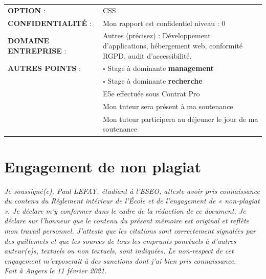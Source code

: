 \documentclass[12pt]{article}
\begin{document}
\begin{center}
	\begin{tabular}{ m{5cm} m{11.5cm} }
	\textbf{OPTION} : &  \mbox{\ooalign{$\checkmark$\cr\hidewidth$\square$\hidewidth\cr}} CSS  \\
    \textbf{CONFIDENTIALITÉ} :  & Mon rapport est confidentiel niveau : \mbox{\ooalign{$\checkmark$\cr\hidewidth$\square$\hidewidth\cr}} 0 \\
    \textbf{DOMAINE ENTREPRISE} : & \mbox{\ooalign{$\checkmark$\cr\hidewidth$\square$\hidewidth\cr}} Autres (précisez) : Développement d'applications, hébergement web, conformité RGPD, audit d'accessibilité. \\
    \textbf{AUTRES POINTS} : &  $\square$ Stage à dominante \textbf{management} \\
                             &  $\square$ Stage à dominante \textbf{recherche} \\
                             & \mbox{\ooalign{$\checkmark$\cr\hidewidth$\square$\hidewidth\cr}} E5e effectuée sous Contrat Pro \\
                             &  \mbox{\ooalign{$\checkmark$\cr\hidewidth$\square$\hidewidth\cr}} Mon tuteur sera présent à ma soutenance \\
                             &  \mbox{\ooalign{$\checkmark$\cr\hidewidth$\square$\hidewidth\cr}} Mon tuteur participera au déjeuner le jour de ma soutenance \\
\end{tabular}
\end{center}

\newpage
\section*{Engagement de non plagiat}
\textit{Je soussigné(e), Paul LEFAY, étudiant à l'\gls{ESEO}, atteste avoir pris connaissance du contenu du Règlement intérieur de l'École et de l'engagement de « non-plagiat ». 
Je déclare m'y conformer dans le cadre de la rédaction de ce document. 
Je déclare sur l'honneur que le contenu du présent mémoire est original et reflète mon travail personnel. 
J'atteste que les citations sont correctement signalées par des guillemets et que les sources de tous les emprunts ponctuels à d'autres auteur(e)s, textuels ou non textuels, sont indiquées. 
Le non-respect de cet engagement m'exposerait à des sanctions dont j'ai bien pris connaissance.} \\

\textit{Fait à Angers le 11 février 2021.}
\end{document}
